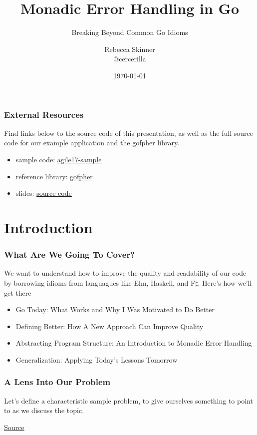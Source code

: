 \documentclass{beamer}
\title{Monadic Error Handling in Go}
\subtitle{Breaking Beyond Common Go Idioms}
\author{Rebecca Skinner\\ \small{@cercerilla}}
\institute{Asteris, LLC}
\date{\today}
\newcommand{\chref}[3] {
  {\color{#1} \href{#2}{\underline{#3}}}
}
\begin{document}
\begin{frame}
  \titlepage{}
\end{frame}

\begin{frame}
  \frametitle{External Resources}
  Find links below to the source code of this presentation, as well as
  the full source code for our example application and the gofpher
  library.
  \\\vfill
  \begin{itemize}
    \item sample code: \chref{blue}{https://github.com/rebeccaskinner/agile17-sample}{agile17-sample}
    \item reference library: \chref{blue}{https://github.com/rebeccaskinner/gofpher}{gofpher}
    \item slides: \chref{blue}{https://github.com/rebeccaskinner/presentations/tree/agile-tech-2017/agile_tech_conference_2017}{source code}
  \end{itemize}
\end{frame}

\section{Introduction}

\begin{frame}
  \frametitle{What Are We Going To Cover?}
  We want to understand how to improve the quality and readability of
  our code by borrowing idioms from languagues like Elm, Haskell, and
  F$\sharp$.  Here's how we'll get there
  \\\vfill
  \begin{itemize}
  \item Go Today: What Works and Why I Was Motivated to Do Better
  \item Defining Better: How A New Approach Can Improve Quality
  \item Abstracting Program Structure: An Introduction to Monadic Error Handling
  \item Generalization: Applying Today's Lessons Tomorrow
  \end{itemize}
\end{frame}

\begin{frame}[fragile]
  \frametitle{A Lens Into Our Problem}
  Let's define a characteristic sample problem, to give ourselves
  something to point to as we discuss the topic.
  \vfill
  \chref{blue}{https://github.com/rebeccaskinner/agile17-sample}{Source}
  \vfill

\end{frame}
\end{document}
